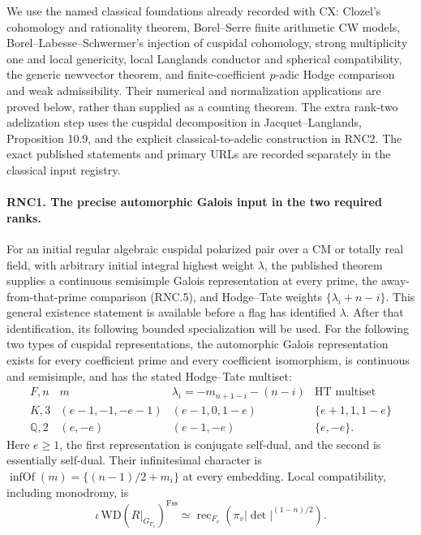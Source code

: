 \documentclass[11pt,a4paper]{article}
\numberwithin{equation}{section}
\theoremstyle{remark}\newtheorem{remark}[theorem]{Remark}
\begin{document}
We use the named classical foundations already recorded with CX:
Clozel's cohomology and rationality theorem, Borel--Serre finite
arithmetic CW models, Borel--Labesse--Schwermer's injection of
cuspidal cohomology, strong multiplicity one and local genericity,
local Langlands conductor and spherical compatibility, the generic
newvector theorem, and finite-coefficient $p$-adic Hodge comparison
and weak admissibility.  Their numerical and normalization
applications are proved below, rather than supplied as a counting
theorem.  The extra rank-two adelization step uses the cuspidal
decomposition in Jacquet--Langlands, Proposition 10.9, and the
explicit classical-to-adelic construction in RNC2.  The exact
published statements and primary URLs are recorded separately in
the classical input registry.

\paragraph{RNC1. The precise automorphic Galois input in the two required ranks.}
\label{claim:RNC1}
For an initial regular algebraic cuspidal polarized pair over
a CM or totally real field, with arbitrary initial integral
highest weight $\lambda$, the published theorem supplies a
continuous semisimple Galois representation at every prime,
the away-from-that-prime comparison (RNC.5), and Hodge--Tate
weights $\{\lambda_i+n-i\}$.  This general existence statement
is available before a flag has identified $\lambda$.
After that identification, its following bounded
specialization will be used.
For the following two types of cuspidal representations, the
automorphic Galois representation exists for every coefficient
prime and every coefficient isomorphism, is continuous and
semisimple, and has the stated Hodge--Tate multiset:
\[
\begin{array}{c|c|c|c}
 F,n& m&\lambda_i=-m_{n+1-i}-(n-i)&\mathrm{HT}\text{ multiset}\\ \hline
 K,3&(e-1,-1,-e-1)&(e-1,0,1-e)&\{e+1,1,1-e\}\\
 \mathbb Q,2&(e,-e)&(e-1,-e)&\{e,-e\}.
\end{array}                                                     \tag{RNC.4}
\]
Here $e\geq1$, the first representation is conjugate self-dual,
and the second is essentially self-dual.  Their infinitesimal
character is $\operatorname{infOf}(m)=\{(n-1)/2+m_i\}$ at every
embedding.  Local compatibility, including monodromy, is
\[
 \iota\,\mathrm{WD}(R|_{G_{F_v}})^{\mathrm{F\!ss}}
      \simeq\operatorname{rec}_{F_v}
                    (\pi_v|\det|^{(1-n)/2}) .                 \tag{RNC.5}
\]
\end{document}
